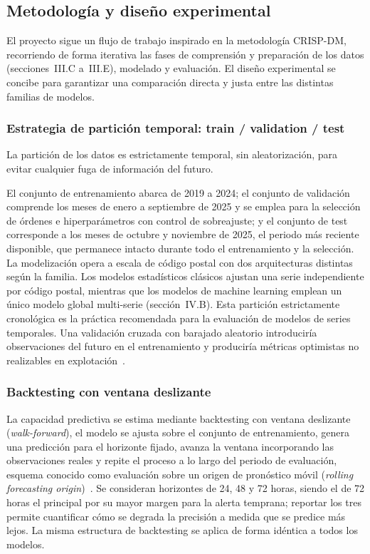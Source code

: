\documentclass[12pt, a4paper]{article}
\begin{document}
\subsection{Metodología y diseño experimental}

El proyecto sigue un flujo de trabajo inspirado en la metodología CRISP-DM, recorriendo de forma iterativa las fases de comprensión y preparación de los datos (secciones~III.C a~III.E), modelado y evaluación. El diseño experimental se concibe para garantizar una comparación directa y justa entre las distintas familias de modelos.

\subsubsection{Estrategia de partición temporal: train / validation / test}

La partición de los datos es estrictamente temporal, sin aleatorización, para evitar cualquier fuga de información del futuro. 

El conjunto de entrenamiento abarca de 2019 a 2024; el conjunto de validación comprende los meses de enero a septiembre de 2025 y se emplea para la selección de órdenes e hiperparámetros con control de sobreajuste; y el conjunto de test corresponde a los meses de octubre y noviembre de 2025, el periodo más reciente disponible, que permanece intacto durante todo el entrenamiento y la selección. La modelización opera a escala de código postal con dos arquitecturas distintas según la familia. Los modelos estadísticos clásicos ajustan una serie independiente por código postal, mientras que los modelos de machine learning emplean un único modelo global multi-serie (sección~IV.B). Esta partición estrictamente cronológica es la práctica recomendada para la evaluación de modelos de series temporales. Una validación cruzada con barajado aleatorio introduciría observaciones del futuro en el entrenamiento y produciría métricas optimistas no realizables en explotación~\cite{hyndman2021}.

\subsubsection{Backtesting con ventana deslizante}

La capacidad predictiva se estima mediante backtesting con ventana deslizante (\textit{walk-forward}), el modelo se ajusta sobre el conjunto de entrenamiento, genera una predicción para el horizonte fijado, avanza la ventana incorporando las observaciones reales y repite el proceso a lo largo del periodo de evaluación, esquema conocido como evaluación sobre un origen de pronóstico móvil (\textit{rolling forecasting origin})~\cite{hyndman2021}. Se consideran horizontes de 24, 48 y 72 horas, siendo el de 72 horas el principal por su mayor margen para la alerta temprana; reportar los tres permite cuantificar cómo se degrada la precisión a medida que se predice más lejos. La misma estructura de backtesting se aplica de forma idéntica a todos los modelos.
\end{document}
